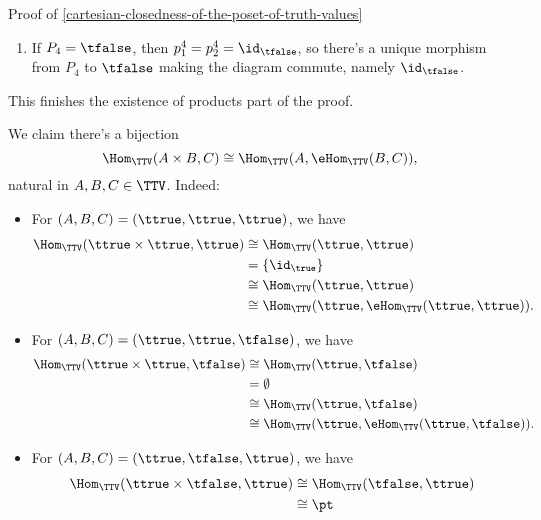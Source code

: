 \begin{Proof}{Proof of \cref{cartesian-closedness-of-the-poset-of-truth-values}}
\begin{enumerate}
        \item\label{proof-of-cartesian-closedness-of-the-poset-of-truth-values-7}If $P_{4}=\tfalse$, then $p^{4}_{1}=p^{4}_{2}=\id_{\tfalse}$, so there's a unique morphism from $P_{4}$ to $\tfalse$ making the diagram commute, namely $\id_{\tfalse}$.
    \end{enumerate}
    This finishes the existence of products part of the proof.

    We claim there's a bijection
    \[
        \Hom_{\TTV}(A\times B,C)%
        \cong%
        \Hom_{\TTV}(A,\eHom_{\TTV}(B,C)),%
    \]%
    natural in $A,B,C\in\TTV$. Indeed:
    \begin{itemize}
        \item For $(A,B,C)=(\ttrue,\ttrue,\ttrue)$, we have
            \begin{align*}
                \Hom_{\TTV}(\ttrue\times\ttrue,\ttrue)    &\cong \Hom_{\TTV}(\ttrue,\ttrue)\\
                                                          &=     \{\id_{\true}\}\\
                                                          &\cong \Hom_{\TTV}(\ttrue,\ttrue)\\
                                                          &\cong \Hom_{\TTV}(\ttrue,\eHom_{\TTV}(\ttrue,\ttrue)).
            \end{align*}
        \item For $(A,B,C)=(\ttrue,\ttrue,\tfalse)$, we have
            \begin{align*}
                \Hom_{\TTV}(\ttrue\times\ttrue,\tfalse)   &\cong \Hom_{\TTV}(\ttrue,\tfalse)\\
                                                          &=     \emptyset\\
                                                          &\cong \Hom_{\TTV}(\ttrue,\tfalse)\\
                                                          &\cong \Hom_{\TTV}(\ttrue,\eHom_{\TTV}(\ttrue,\tfalse)).
            \end{align*}
        \item For $(A,B,C)=(\ttrue,\tfalse,\ttrue)$, we have
            \begin{align*}
                \Hom_{\TTV}(\ttrue\times\tfalse,\ttrue)   &\cong \Hom_{\TTV}(\tfalse,\ttrue)\\
                                                          &\cong \pt\\

\end{align*}
\end{itemize}
\end{Proof}

